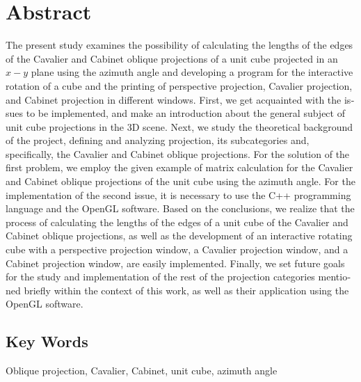 \newpage

\chapter*{\textlatin{Abstract}}

\textlatin{The present study examines the possibility of calculating the lengths of the edges of the Cavalier and Cabinet oblique projections of a unit cube projected in an $x-y$ plane using the azimuth angle and developing a program for the interactive rotation of a cube and the printing of perspective projection, Cavalier projection, and Cabinet projection in different windows. First, we get acquainted with the issues to be implemented, and make an introduction about the general subject of unit cube projections in the 3D scene. Next, we study the theoretical background of the project, defining and analyzing projection, its subcategories and, specifically, the Cavalier and Cabinet oblique projections. For the solution of the first problem, we employ the given example of matrix calculation for the Cavalier and Cabinet oblique projections of the unit cube using the azimuth angle. For the implementation of the second issue, it is necessary to use the C++ programming language and the OpenGL software. Based on the conclusions, we realize that the process of calculating the lengths of the edges of a unit cube of the Cavalier and Cabinet oblique projections, as well as the development of an interactive rotating cube with a perspective projection window, a Cavalier projection window, and a Cabinet projection window, are easily implemented. Finally, we set future goals for the study and implementation of the rest of the projection categories mentioned briefly within the context of this work, as well as their application using the OpenGL software.}

\vspace{1.5em}

\section*{\textlatin{Key Words}}
\textlatin{Oblique projection, Cavalier, Cabinet, unit cube, azimuth angle}
